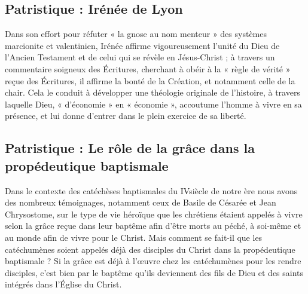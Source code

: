 \begin{references}



\end{references}



\subsection{Patristique : Irénée de Lyon}

Dans son effort pour réfuter « la gnose au nom menteur » des systèmes marcionite et valentinien, Irénée affirme vigoureusement l'unité du Dieu de l'Ancien Testament et de celui qui se révèle en Jésus-Christ ; à travers un commentaire soigneux des Écritures, cherchant à obéir à la « règle de vérité » reçue des Écritures, il affirme la bonté de la Création, et notamment celle de la chair. Cela le conduit à développer une théologie originale de l'histoire, à travers laquelle Dieu, « d'économie » en « économie », accoutume l'homme à vivre en sa présence, et lui donne d'entrer dans le plein exercice de sa liberté.\\

\begin{references}
	

\end{references}


\subsection{Patristique : Le rôle de la grâce dans la propédeutique baptismale} 

Dans le contexte des catéchèses baptismales du IV\ieme siècle de notre ère nous avons des nombreux témoignages, notamment ceux de Basile de Césarée et Jean Chrysostome, sur le type de vie héroïque que les chrétiens étaient appelés à vivre selon la grâce reçue dans leur baptême afin d’être morts au péché, à soi-même et au monde afin de vivre pour le Christ. Mais comment se fait-il que les catéchumènes soient appelés déjà des disciples du Christ dans la propédeutique baptismale ? Si la grâce est déjà à l’œuvre chez les catéchumènes pour les rendre disciples, c’est bien par le baptême qu’ils deviennent des fils de Dieu et des saints intégrés dans l’Église du Christ.\\

